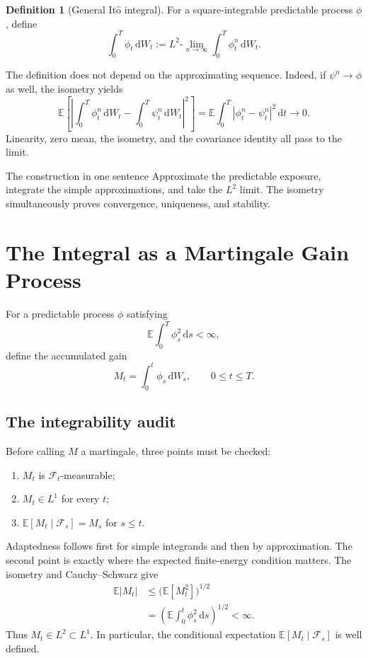 \documentclass[10pt]{article}
\newcommand{\E}{\mathbb E}
\newcommand{\1}{\mathbf 1}
\newcommand{\cF}{\mathcal F}
\newcommand{\dd}{\,\mathrm d}
\newcommand{\Ito}{\mathrm{It\hat{o}}}
\theoremstyle{definition}
\newtheorem{definition}{Definition}[section]
\begin{document}
\begin{definition}[General \(\Ito\) integral]
For a square-integrable predictable process \(\phi\), define
\[
\boxed{
\int_0^T\phi_t\dd W_t
:=L^2\text{-}\lim_{n\to\infty}
\int_0^T\phi_t^n\dd W_t.}
\]
\end{definition}

The definition does not depend on the approximating sequence. Indeed, if
\(\psi^n\to\phi\) as well, the isometry yields
\[
\E\left[
\left|
\int_0^T\phi_t^n\dd W_t-
\int_0^T\psi_t^n\dd W_t
\right|^2
\right]
=\E\int_0^T|\phi_t^n-\psi_t^n|^2\dd t\longrightarrow0.
\]
Linearity, zero mean, the isometry, and the covariance identity all pass to
the limit.

\begin{keyidea}{The construction in one sentence}
Approximate the predictable exposure, integrate the simple approximations, and
take the \(L^2\) limit. The isometry simultaneously proves convergence,
uniqueness, and stability.
\end{keyidea}

\section{The Integral as a Martingale Gain Process}

For a predictable process \(\phi\) satisfying
\[
\E\int_0^T\phi_s^2\dd s<\infty,
\]
define the accumulated gain
\[
M_t=\int_0^t\phi_s\dd W_s,
\qquad 0\leq t\leq T.
\]

\subsection{The integrability audit}

Before calling \(M\) a martingale, three points must be checked:
\begin{enumerate}
  \item \(M_t\) is \(\cF_t\)-measurable;
  \item \(M_t\in L^1\) for every \(t\);
  \item \(\E[M_t\mid\cF_s]=M_s\) for \(s\leq t\).
\end{enumerate}
Adaptedness follows first for simple integrands and then by approximation. The
second point is exactly where the expected finite-energy condition matters.
The isometry and Cauchy--Schwarz give
\begin{align*}
\E|M_t|
&\leq \bigl(\E[M_t^2]\bigr)^{1/2}\\
&=\left(\E\int_0^t\phi_s^2\dd s\right)^{1/2}<\infty.
\end{align*}
Thus \(M_t\in L^2\subset L^1\). In particular, the conditional expectation
\(\E[M_t\mid\cF_s]\) is well defined.
\end{document}
